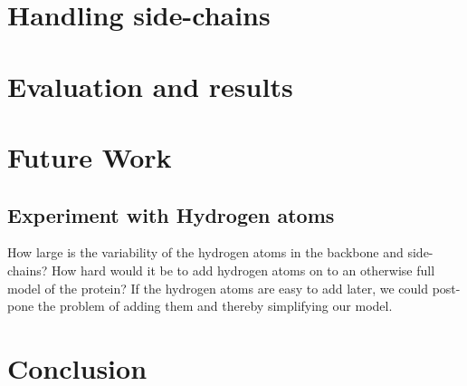 \documentclass[10pt,a4paper,final,oneside,openany,article,twocolumn]{memoir}
\begin{document}
\chapter{Handling side-chains}
\label{chap:handling_sidechains}


\chapter{Evaluation and results}



\chapter{Future Work}

\section{Experiment with Hydrogen atoms}
How large is the variability of the hydrogen atoms in the backbone and
side-chains? How hard would it be to add hydrogen atoms on to an
otherwise full model of the protein? If the hydrogen atoms are easy to
add later, we could post-pone the problem of adding them and thereby
simplifying our model.

\chapter{Conclusion}

\printbibliography
\end{document}
